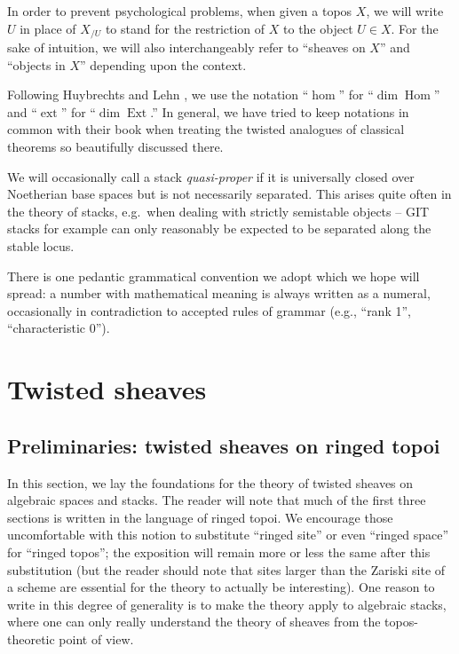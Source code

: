 \documentclass[11pt]{amsart}
\renewcommand{\hom}{\operatorname{Hom}}
\DeclareMathOperator{\ext}{\operatorname{Ext}}
\DeclareMathOperator{\dimhom}{hom}
\DeclareMathOperator{\dimext}{ext}
\renewcommand{\[}{[\!\hspace{0.03em}[}
\renewcommand{\]}{]\!\hspace{0.03em}]}
\renewcommand{\(}{(\!\hspace{0.03em}(}
\renewcommand{\)}{)\!\hspace{0.03em})}
\theoremstyle{definition}
\theoremstyle{remark}
\begin{document}
In order to prevent psychological problems, when given a topos $X$, we 
will write $U$ in place of $X_{/U}$ to stand for the restriction of 
$X$ to the object $U\in X$.  For the sake of intuition, we will also interchangeably 
refer to ``sheaves on $X$'' and ``objects in $X$'' depending upon the 
context.

Following Huybrechts and Lehn \cite{h-l}, we use the notation 
``$\dimhom$'' for ``$\dim\hom$'' and 
``$\dimext$'' for ``$\dim\ext$.''  In general, we have tried to keep 
notations in common with their book when treating the twisted 
analogues of classical theorems so beautifully discussed there.

We will occasionally call a stack \emph{quasi-proper\/} if it is universally closed over Noetherian base spaces but is not necessarily separated.  This arises quite often in the theory of stacks, e.g.\ when dealing with strictly semistable objects -- GIT stacks for example can only reasonably be expected to be separated along the stable locus.

There is one pedantic grammatical convention we adopt which we hope will spread: a number 
with mathematical meaning is always written as a numeral, occasionally 
in contradiction to accepted rules of grammar (e.g., 
``rank 1'', ``characteristic 0'').  

\section{Twisted sheaves}\label{S:twisted sheaves big}
\subsection{Preliminaries: twisted sheaves on ringed topoi}\label{S:prelim}
In this section, we lay the foundations for the theory of twisted 
sheaves on algebraic spaces and stacks.  The reader will note that much of the first three 
sections is written in the language of ringed topoi.  We encourage 
those uncomfortable with this notion to substitute ``ringed site'' or 
even ``ringed space'' for ``ringed topos''; the exposition will remain 
more or less the same after this substitution (but the reader should 
note that sites larger than 
the Zariski site of a scheme are essential for the theory to actually be interesting).  
One reason to write in this 
degree of generality is to make the theory apply to algebraic stacks, 
where one can only really understand the theory of sheaves from the 
topos-theoretic point of view.
\end{document}
